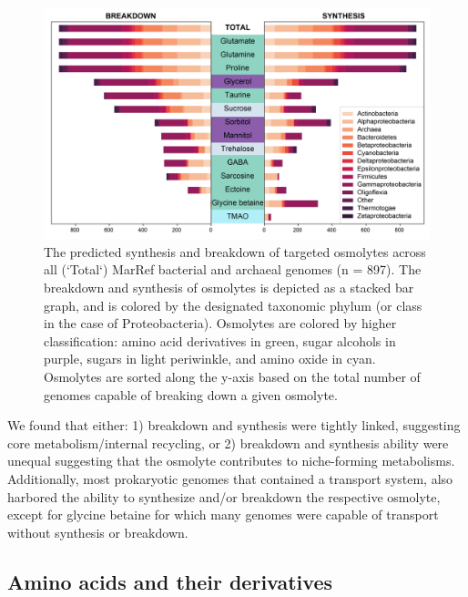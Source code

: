 \documentclass[utf8]{frontiersSCNS} %
\begin{document}
\begin{figure}[t!]    \centering
    \includegraphics[width = 0.9\columnwidth]{Figures/Bacteria-Synthesis-Breakdown-v2021-03-14-01.png}
    \caption{The predicted synthesis and breakdown of targeted osmolytes across all (`Total`) MarRef bacterial and archaeal genomes (n = 897). The breakdown and synthesis of osmolytes is depicted as a stacked bar graph, and is colored by the designated taxonomic phylum (or class in the case of Proteobacteria). Osmolytes are colored by higher classification: amino acid derivatives in green, sugar alcohols in purple, sugars in light periwinkle, and amino oxide in cyan. Osmolytes are sorted along the y-axis based on the total number of genomes capable of breaking down a given osmolyte.}
    \label{fig:bact}
\end{figure}

We found that either: 1) breakdown and synthesis were tightly linked, suggesting core metabolism/internal recycling, or 2) breakdown and synthesis ability were unequal suggesting that the osmolyte contributes to niche-forming metabolisms. Additionally, most prokaryotic genomes that contained a transport system, also harbored the ability to synthesize and/or breakdown the respective osmolyte, except for glycine betaine for which many genomes were capable of transport without synthesis or breakdown.

\subsection{Amino acids and their derivatives}
\end{document}
